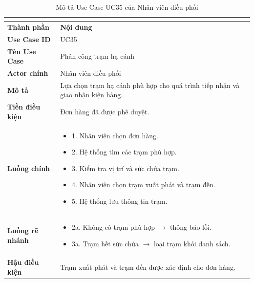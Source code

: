 \begin{longtable}{|C{3cm}|L{11cm}|}
\caption{Mô tả Use Case UC35 của Nhân viên điều phối}\\
\label{tab:mo-ta-uc35-dieu-phoi}\\
\hline
\textbf{Thành phần} & \textbf{Nội dung} \\
\hline
\textbf{Use Case ID} & UC35 \\
\hline
\textbf{Tên Use Case} & Phân công trạm hạ cánh \\
\hline
\textbf{Actor chính} & Nhân viên điều phối \\
\hline
\textbf{Mô tả} &
Lựa chọn trạm hạ cánh phù hợp cho quá trình tiếp nhận và giao nhận kiện hàng. \\
\hline
\textbf{Tiền điều kiện} &
Đơn hàng đã được phê duyệt. \\
\hline
\textbf{Luồng chính} &
\begin{itemize}[leftmargin=*,topsep=2pt,itemsep=2pt]
    \item 1. Nhân viên chọn đơn hàng.
    \item 2. Hệ thống tìm các trạm phù hợp.
    \item 3. Kiểm tra vị trí và sức chứa trạm.
    \item 4. Nhân viên chọn trạm xuất phát và trạm đến.
    \item 5. Hệ thống lưu thông tin trạm.
\end{itemize} \\
\hline
\textbf{Luồng rẽ nhánh} &
\begin{itemize}[leftmargin=*,topsep=2pt,itemsep=2pt]
    \item 2a. Không có trạm phù hợp $\rightarrow$ thông báo lỗi.
    \item 3a. Trạm hết sức chứa $\rightarrow$ loại trạm khỏi danh sách.
\end{itemize} \\
\hline
\textbf{Hậu điều kiện} &
Trạm xuất phát và trạm đến được xác định cho đơn hàng. \\
\hline
\end{longtable}


